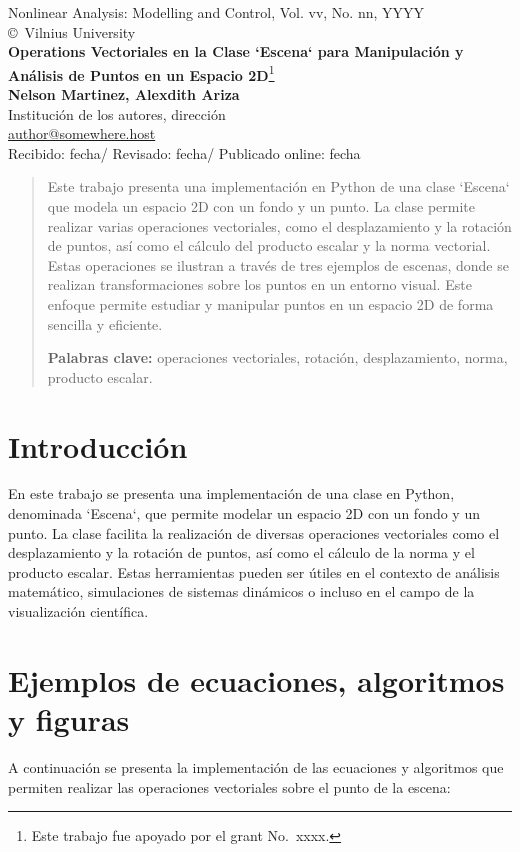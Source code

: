 \documentclass[a4paper, 10pt]{article}
\begin{document}
\begin{center}
Nonlinear Analysis: Modelling and Control, Vol. vv, No. nn, YYYY\\
\copyright\ Vilnius University\\[24pt]
\LARGE
\textbf{Operations Vectoriales en la Clase `Escena` para Manipulación y Análisis de Puntos en un Espacio 2D}\footnote{Este trabajo fue apoyado por el grant No.\ xxxx.}\\[6pt]
\small
\textbf{Nelson Martinez, Alexdith Ariza}\\[6pt]
Institución de los autores, dirección\\
\href{mailto:author@somewhere.host}{author@somewhere.host}\\[6pt]
Recibido: fecha\quad/\quad
Revisado: fecha\quad/\quad
Publicado online: fecha
\end{center}

\begin{abstract}
Este trabajo presenta una implementación en Python de una clase `Escena` que modela un espacio 2D con un fondo y un punto. La clase permite realizar varias operaciones vectoriales, como el desplazamiento y la rotación de puntos, así como el cálculo del producto escalar y la norma vectorial. Estas operaciones se ilustran a través de tres ejemplos de escenas, donde se realizan transformaciones sobre los puntos en un entorno visual. Este enfoque permite estudiar y manipular puntos en un espacio 2D de forma sencilla y eficiente.
\vskip 2mm

\textbf{Palabras clave:} operaciones vectoriales, rotación, desplazamiento, norma, producto escalar.
\end{abstract}

\nocite{2009ProcDETAp}

\section{Introducción}\label{s:1}
En este trabajo se presenta una implementación de una clase en Python, denominada `Escena`, que permite modelar un espacio 2D con un fondo y un punto. La clase facilita la realización de diversas operaciones vectoriales como el desplazamiento y la rotación de puntos, así como el cálculo de la norma y el producto escalar. Estas herramientas pueden ser útiles en el contexto de análisis matemático, simulaciones de sistemas dinámicos o incluso en el campo de la visualización científica.

\section{Ejemplos de ecuaciones, algoritmos y figuras}\label{s:2}
A continuación se presenta la implementación de las ecuaciones y algoritmos que permiten realizar las operaciones vectoriales sobre el punto de la escena:
\end{document}
